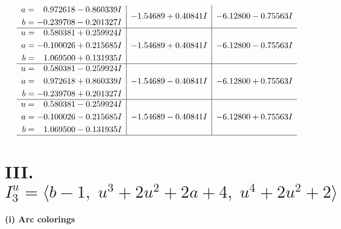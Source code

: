 \documentclass[1p]{elsarticle_modified}
\theoremstyle{definition}
\begin{document}
$$\begin{array}{c|c|c}
\begin{aligned}
a &= \phantom{-}0.972618 - 0.860339 I \\
b &= -0.239708 - 0.201327 I\end{aligned}
 & -1.54689 + 0.40841 I & -6.12800 - 0.75563 I \\ \hline\begin{aligned}
u &= \phantom{-}0.580381 + 0.259924 I \\
a &= -0.100026 + 0.215685 I \\
b &= \phantom{-}1.069500 + 0.131935 I\end{aligned}
 & -1.54689 + 0.40841 I & -6.12800 - 0.75563 I \\ \hline\begin{aligned}
u &= \phantom{-}0.580381 - 0.259924 I \\
a &= \phantom{-}0.972618 + 0.860339 I \\
b &= -0.239708 + 0.201327 I\end{aligned}
 & -1.54689 - 0.40841 I & -6.12800 + 0.75563 I \\ \hline\begin{aligned}
u &= \phantom{-}0.580381 - 0.259924 I \\
a &= -0.100026 - 0.215685 I \\
b &= \phantom{-}1.069500 - 0.131935 I\end{aligned}
 & -1.54689 - 0.40841 I & -6.12800 + 0.75563 I\\
 \hline 
 \end{array}$$\newpage\newpage\renewcommand{\arraystretch}{1}
\centering \section*{III. $I^u_{3}= \langle b-1,\;u^3+2 u^2+2 a+4,\;u^4+2 u^2+2 \rangle$}
\flushleft \textbf{(i) Arc colorings}\\
\end{document}
